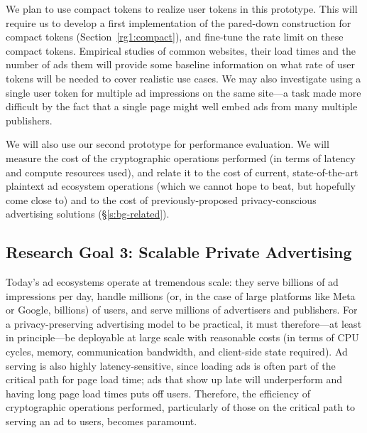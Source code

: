 %
We plan to use compact tokens to realize user tokens in this prototype.
%
This will require us to develop a first implementation of the pared-down construction for compact tokens (Section~\ref{rg1:compact}), and fine-tune the rate limit on these compact tokens.
%
Empirical studies of common websites, their load times and the number of ads them will provide some baseline information on what rate of user tokens will be needed to cover realistic use cases.
%
We may also investigate using a single user token for multiple ad impressions on the same site---a task made more difficult by the fact that a single page might well embed ads from many multiple publishers.
%

%
We will also use our second prototype for performance evaluation.
%
We will measure the cost of the cryptographic operations performed (in terms of latency and compute resources used), and relate it to the cost of current, state-of-the-art plaintext ad ecosystem operations (which we cannot hope to beat, but hopefully come close to) and to the cost of previously-proposed privacy-conscious advertising solutions (\S\ref{s:bg-related}).
%

\subsection{Research Goal 3: Scalable Private Advertising}
\label{s:rg3}

%
Today's ad ecosystems operate at tremendous scale: they serve billions of ad impressions per day, handle millions (or, in the case of large platforms like Meta or Google, billions) of users, and serve millions of advertisers and publishers.
%
For a privacy-preserving advertising model to be practical, it must therefore---at least in principle---be deployable at large scale with reasonable costs (in terms of CPU cycles, memory, communication bandwidth, and client-side state required).
%
Ad serving is also highly latency-sensitive, since loading ads is often part of the critical path for page load time; ads that show up late will underperform and having long page load times puts off users.
%
Therefore, the efficiency of cryptographic operations performed, particularly of those on the critical path to serving an ad to users, becomes paramount.
%

